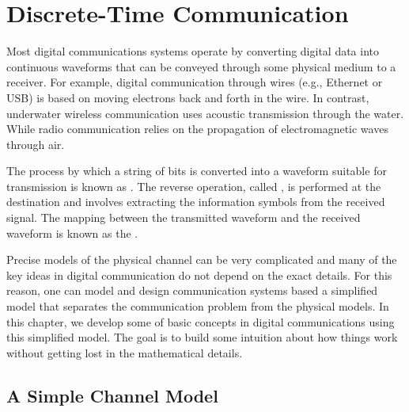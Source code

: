 \chapter{Discrete-Time Communication}
\label{chapter:DiscreteTimeComm}

Most digital communications systems operate by converting digital data into continuous waveforms that can be conveyed through some physical medium to a receiver.
For example, digital communication through wires (e.g., Ethernet or USB) is based on moving electrons back and forth in the wire.
In contrast, underwater wireless communication uses acoustic transmission through the water.
While radio communication relies on the propagation of electromagnetic waves through air.

The process by which a string of bits is converted into a waveform suitable for transmission is known as .
The reverse operation, called , is performed at the destination and involves extracting the information symbols from the received signal.
The mapping between the transmitted waveform and the received waveform is known as the .

Precise models of the physical channel can be very complicated and many of the key ideas in digital communication do not depend on the exact details.
For this reason, one can model and design communication systems based a simplified model that separates the communication problem from the physical models.
In this chapter, we develop some of basic concepts in digital communications using this simplified model.
The goal is to build some intuition about how things work without getting lost in the mathematical details.

\section{A Simple Channel Model}

